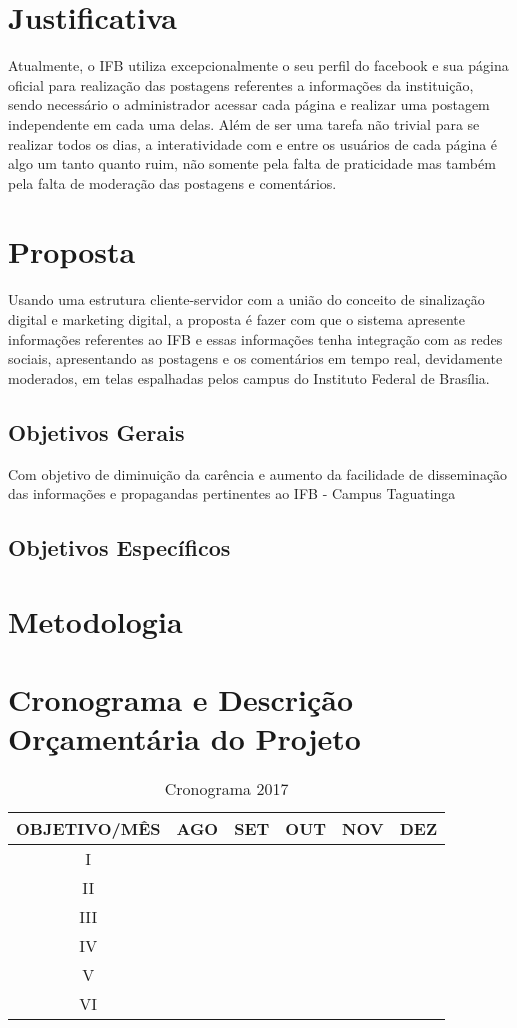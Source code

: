 \documentclass[
	12pt,				%
	openright,			%
	oneside,			%
	a4paper,			%
	english,			%
	french,				%
	spanish,			%
	brazil,				%
	]{abntex2}
\begin{document}
\section*{Justificativa}
	Atualmente, o IFB utiliza excepcionalmente o seu perfil do facebook e sua página oficial para realização das postagens referentes a informações da instituição, sendo necessário o administrador acessar cada página e realizar uma postagem independente em cada uma delas. Além de ser uma tarefa não trivial para se realizar todos os dias, a interatividade com e entre os usuários de cada página é algo um tanto quanto ruim, não somente pela falta de praticidade mas também pela falta de moderação das postagens e comentários.
	
\section*{Proposta}
	Usando uma estrutura cliente-servidor com a união do conceito de sinalização digital e marketing digital, a proposta é fazer com que o sistema apresente informações referentes ao IFB e essas informações tenha integração com as redes sociais, apresentando as postagens e os comentários em tempo real, devidamente moderados, em telas espalhadas pelos campus do Instituto Federal de Brasília.
	
\subsection*{Objetivos Gerais}
	Com objetivo de diminuição da carência e aumento da facilidade de disseminação das informações e propagandas pertinentes ao IFB - Campus Taguatinga
\subsection*{Objetivos Específicos}

\section*{Metodologia}

\section*{Cronograma e Descrição Orçamentária do Projeto}
	\begin{table}[h!]
		\centering
		\caption{Cronograma 2017}
		\label{my-label}
		\begin{tabular}{|c|c|c|c|c|c|}
			\hline
			OBJETIVO/MÊS & AGO & SET & OUT & NOV & DEZ \\ \hline
			I &  & & & & \\ \hline
			II &  & & & & \\ \hline
			III &  & & & & \\ \hline
			IV &  & & & & \\ \hline
			V &  & & & & \\ \hline
			VI &  & & & & \\ \hline
		\end{tabular}
	\end{table}
\end{document}
